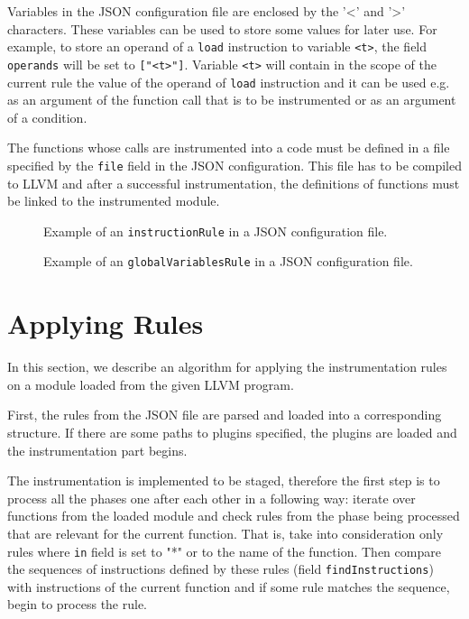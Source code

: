 Variables in the JSON configuration file are enclosed by the '<' and '>'
characters. These variables can be used to store some values for later use. For
example, to store an operand of a \texttt{load} instruction to variable
\texttt{<t>}, the field \texttt{operands} will be set to \texttt{["<t>"]}.
Variable \texttt{<t>} will contain in the scope of the current rule the value
of the operand of \texttt{load} instruction and it can be used e.g. as an
argument of the function call that is to be instrumented or as an argument of a
condition.

The functions whose calls are instrumented into a code must be defined in a
file specified by the \texttt{file} field in the JSON configuration. This file
has to be compiled to LLVM and after a successful instrumentation, the
definitions of functions must be linked to the instrumented module.

\begin{figure}[h]

\caption{Example of an \texttt{instructionRule} in a JSON configuration file.}
\label{fig:json_example}
\end{figure}

\begin{figure}[h]

\caption{Example of an \texttt{globalVariablesRule} in a JSON configuration file.}
\label{fig:json_example2}
\end{figure}


\section{Applying Rules}

In this section, we describe an algorithm for applying the instrumentation
rules on a module loaded from the given LLVM program.


First, the rules from the JSON file are parsed and loaded into a corresponding
structure. If there are some paths to plugins specified, the plugins are
loaded and the instrumentation part begins.

The instrumentation is implemented to be staged, therefore the first step is to
process all the phases one after each other in a following way: iterate over
functions from the loaded module and check rules from the phase being processed
that are relevant for the current function. That is, take into consideration
only rules where \texttt{in} field is set to "*" or to the name of the
function. Then compare the sequences of instructions defined by these rules
(field \texttt{findInstructions}) with instructions of the current function and
if some rule matches the sequence, begin to process the rule.

